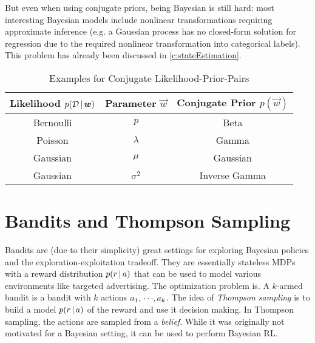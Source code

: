 	But even when using conjugate priors, being Bayesian is still hard: most interesting Bayesian models include nonlinear transformations requiring approximate inference (e.g. a Gaussian process has no closed-form solution for regression due to the required nonlinear transformation into categorical labels). This problem has already been discussed in \autoref{c:stateEstimation}.

	\begin{table}
		\centering
		\begin{tabular}{c|c|c}
			\textbf{Likelihood} \( p(\mathcal{D} \,\vert\, \bm{w}) \) & \textbf{Parameter} \( \vec{w} \) & \textbf{Conjugate Prior} \( p(\vec{w}) \) \\ \hline
			Bernoulli                                               & \(p\)                            & Beta                                      \\
			Poisson                                                 & \(\lambda\)                      & Gamma                                     \\
			Gaussian                                                & \(\mu\)                          & Gaussian                                  \\
			Gaussian                                                & \(\sigma^2\)                     & Inverse Gamma
		\end{tabular}
		\caption{Examples for Conjugate Likelihood-Prior-Pairs}
		\label{tab:conjugatePrior}
	\end{table}

	\section{Bandits and Thompson Sampling}
		Bandits are (due to their simplicity) great settings for exploring Bayesian policies and the exploration-exploitation tradeoff. They are essentially stateless MDPs with a reward distribution \( p(r \,\vert\, a) \) that can be used to model various environments like targeted advertising. The optimization problem is. A \(k\)-armed bandit is a bandit with \(k\) actions \( a_1,\,\cdots\!,a_k \). The idea of \emph{Thompson sampling} is to build a model \( p(r \,\vert\, a) \) of the reward and use it decision making. In Thompson sampling, the actions are sampled from a \emph{belief}. While it was originally not motivated for a Bayesian setting, it can be used to perform Bayesian RL.

